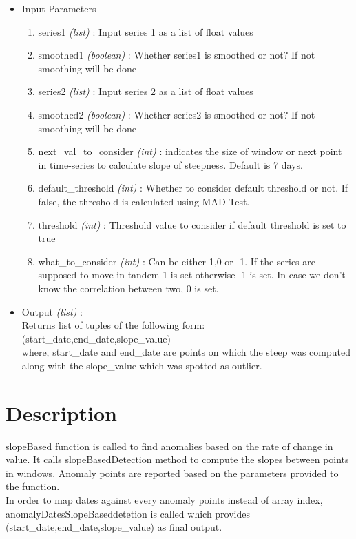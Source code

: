 \begin{itemize}
 \item Input Parameters
 
 \begin{enumerate}
  \item series1 \textit{(list)} : Input series 1 as a list of float values
  \item smoothed1 \textit{(boolean)} : Whether series1 is smoothed or not? If not smoothing will be done
  \item series2 \textit{(list)} : Input series 2 as a list of float values
  \item smoothed2 \textit{(boolean)} : Whether series2 is smoothed or not? If not smoothing will be done
  \item next{\_}val{\_}to{\_}consider \textit{(int)} : indicates the size of window or next point in time-series to calculate slope of steepness. Default is 7 days.
  \item default{\_}threshold \textit{(int)} : Whether to consider default threshold or not. If false, the threshold is calculated using MAD Test.
  \item threshold \textit{(int)} : Threshold value to consider if default threshold is set to true
  \item what{\_}to{\_}consider \textit{(int)} : Can be either 1,0 or -1. If the series are supposed to move in tandem 1 is set otherwise -1 is set. In case we don't know the correlation between two, 0 is set.
  \end{enumerate}

 \item Output \textit{(list)} : \\
 	Returns list of tuples of the following form: \\ 
 	(start\_date,end\_date,slope\_value)\\
 	where, start\_date and end\_date are points on which the steep was computed along with the slope\_value which was spotted as outlier.
 
\end{itemize}

\section{Description}

slopeBased function is called to find anomalies based on the rate of change in value. It calls slopeBasedDetection method to compute the slopes between points in windows. 
Anomaly points are reported based on the parameters provided to the function. \\
In order to map dates against every anomaly points instead of array index, anomalyDatesSlopeBaseddetetion is called which provides (start\_date,end\_date,slope\_value) as final output.